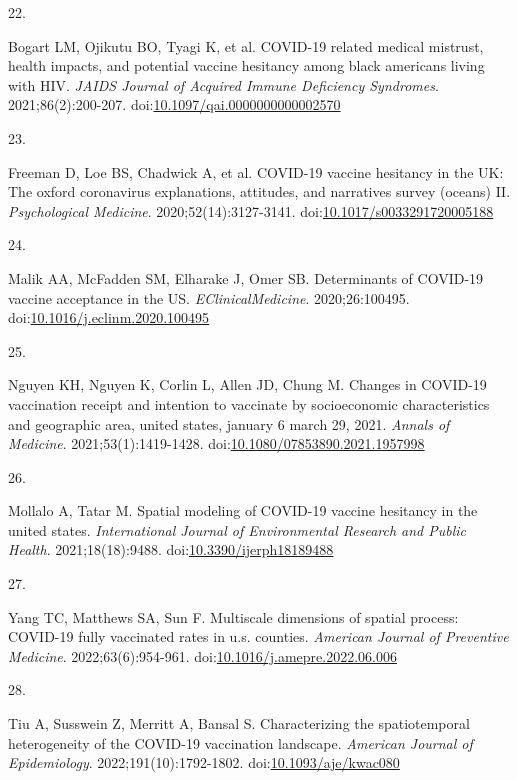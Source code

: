 \documentclass[
  letterpaper,
  DIV=11,
  numbers=noendperiod]{scrartcl}
\newlength{\cslhangindent}
\newlength{\csllabelwidth}
\newlength{\cslentryspacingunit} %
\newenvironment{CSLReferences}[2] %
 {%
  \setlength{\parindent}{0pt}
  \ifodd #1
  \let\oldpar\par
  \def\par{\hangindent=\cslhangindent\oldpar}
  \fi
  \setlength{\parskip}{#2\cslentryspacingunit}
 }%
 {}
\newcommand{\CSLLeftMargin}[1]{\parbox[t]{\csllabelwidth}{#1}}
\newcommand{\CSLRightInline}[1]{\parbox[t]{\linewidth - \csllabelwidth}{#1}\break}
\begin{document}
\begin{CSLReferences}{0}{0}
\leavevmode{}%
\CSLLeftMargin{22. }%
\CSLRightInline{Bogart LM, Ojikutu BO, Tyagi K, et al. {COVID}-19
related medical mistrust, health impacts, and potential vaccine
hesitancy among black americans living with {HIV}. \emph{{JAIDS} Journal
of Acquired Immune Deficiency Syndromes}. 2021;86(2):200-207.
doi:\href{https://doi.org/10.1097/qai.0000000000002570}{10.1097/qai.0000000000002570}}

\leavevmode{}%
\CSLLeftMargin{23. }%
\CSLRightInline{Freeman D, Loe BS, Chadwick A, et al. {COVID}-19 vaccine
hesitancy in the {UK}: The oxford coronavirus explanations, attitudes,
and narratives survey (oceans) {II}. \emph{Psychological Medicine}.
2020;52(14):3127-3141.
doi:\href{https://doi.org/10.1017/s0033291720005188}{10.1017/s0033291720005188}}

\leavevmode{}%
\CSLLeftMargin{24. }%
\CSLRightInline{Malik AA, McFadden SM, Elharake J, Omer SB. Determinants
of {COVID}-19 vaccine acceptance in the {US}.
\emph{{EClinicalMedicine}}. 2020;26:100495.
doi:\href{https://doi.org/10.1016/j.eclinm.2020.100495}{10.1016/j.eclinm.2020.100495}}

\leavevmode{}%
\CSLLeftMargin{25. }%
\CSLRightInline{Nguyen KH, Nguyen K, Corlin L, Allen JD, Chung M.
Changes in {COVID}-19 vaccination receipt and intention to vaccinate by
socioeconomic characteristics and geographic area, united states,
january 6 {\textendash} march 29, 2021. \emph{Annals of Medicine}.
2021;53(1):1419-1428.
doi:\href{https://doi.org/10.1080/07853890.2021.1957998}{10.1080/07853890.2021.1957998}}

\leavevmode{}%
\CSLLeftMargin{26. }%
\CSLRightInline{Mollalo A, Tatar M. Spatial modeling of {COVID}-19
vaccine hesitancy in the united states. \emph{International Journal of
Environmental Research and Public Health}. 2021;18(18):9488.
doi:\href{https://doi.org/10.3390/ijerph18189488}{10.3390/ijerph18189488}}

\leavevmode{}%
\CSLLeftMargin{27. }%
\CSLRightInline{Yang TC, Matthews SA, Sun F. Multiscale dimensions of
spatial process: {COVID}-19 fully vaccinated rates in u.s. counties.
\emph{American Journal of Preventive Medicine}. 2022;63(6):954-961.
doi:\href{https://doi.org/10.1016/j.amepre.2022.06.006}{10.1016/j.amepre.2022.06.006}}

\leavevmode{}%
\CSLLeftMargin{28. }%
\CSLRightInline{Tiu A, Susswein Z, Merritt A, Bansal S. Characterizing
the spatiotemporal heterogeneity of the {COVID}-19 vaccination
landscape. \emph{American Journal of Epidemiology}.
2022;191(10):1792-1802.
doi:\href{https://doi.org/10.1093/aje/kwac080}{10.1093/aje/kwac080}}


\end{CSLReferences}
\end{document}
